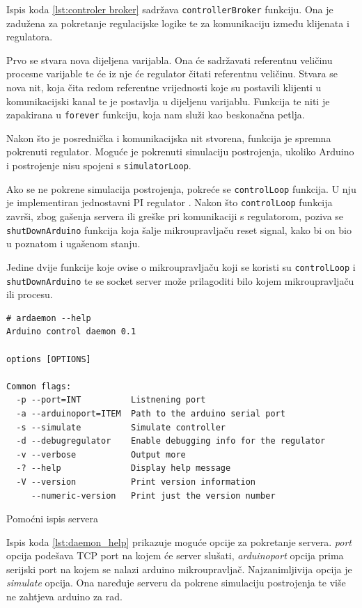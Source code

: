 Ispis koda \ref{lst:controler broker} sadržava
\texttt{controllerBroker} funkciju. Ona je zadužena za pokretanje
regulacijske logike te za komunikaciju između klijenata i regulatora.

Prvo se stvara nova dijeljena varijabla. Ona će sadržavati referentnu veličinu
procesne varijable te će iz nje će regulator čitati referentnu veličinu. Stvara
se nova nit, koja čita redom referentne vrijednosti koje su postavili klijenti u
komunikacijski kanal te je postavlja u dijeljenu varijablu. Funkcija te niti
je zapakirana u \texttt{forever} funkciju, koja nam služi kao
beskonačna petlja.

Nakon što je posrednička i komunikacijska nit stvorena, funkcija je spremna
pokrenuti regulator. Moguće je pokrenuti simulaciju postrojenja, ukoliko Arduino
i postrojenje nisu spojeni s \texttt{simulatorLoop}.

Ako se ne pokrene simulacija postrojenja, pokreće se
\texttt{controlLoop} funkcija. U nju je implementiran jednostavni
PI regulator \cite[494]{control}. Nakon što \texttt{controlLoop}
funkcija završi, zbog gašenja servera ili greške pri komunikaciji s regulatorom,
poziva se \texttt{shutDownArduino} funkcija koja šalje
mikroupravljaču reset signal, kako bi on bio u poznatom i ugašenom stanju.

Jedine dvije funkcije koje ovise o mikroupravljaču koji se koristi su
\texttt{controlLoop} i \texttt{shutDownArduino} te se
socket server može prilagoditi bilo kojem mikroupravljaču ili procesu.

\begin{listing}[H]
\centering
\begin{verbatim}
# ardaemon --help
Arduino control daemon 0.1

options [OPTIONS]

Common flags:
  -p --port=INT          Listnening port
  -a --arduinoport=ITEM  Path to the arduino serial port
  -s --simulate          Simulate controller
  -d --debugregulator    Enable debugging info for the regulator
  -v --verbose           Output more
  -? --help              Display help message
  -V --version           Print version information
     --numeric-version   Print just the version number
\end{verbatim}
\caption{Pomoćni ispis servera}
\label{lst:daemon_help}
\end{listing}

Ispis koda \ref{lst:daemon_help} prikazuje moguće opcije za pokretanje servera.
\emph{port} opcija podešava TCP port na kojem će server slušati,
\emph{arduinoport} opcija prima serijski port na kojem se nalazi arduino
mikroupravljač. Najzanimljivija opcija je \emph{simulate} opcija. Ona naređuje
serveru da pokrene simulaciju postrojenja te više ne zahtjeva arduino za rad.

